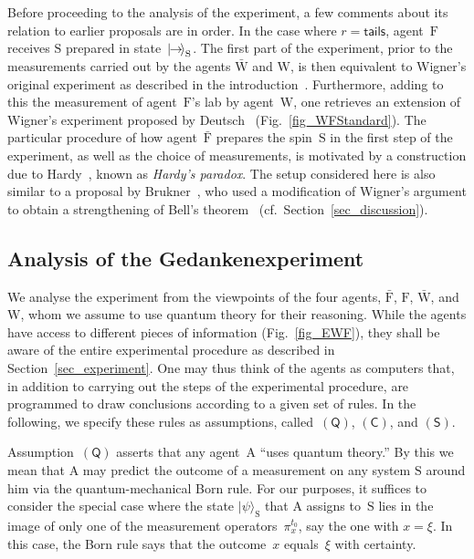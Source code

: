 \documentclass{article}
\theoremstyle{mystyle}
\theoremstyle{definition}
\newcommand*{\ket}[1]{{| #1 \rangle}}
\newcommand*{\Friendone}{\mathrm{\bar{F}}}
\newcommand*{\Friendtwo}{\mathrm{F}}
\newcommand*{\Assistant}{\mathrm{\bar{W}}}
\newcommand*{\Wigner}{\mathrm{W}}
\newcommand*{\Agent}{\mathrm{A}}
\newcommand*{\System}{\mathrm{S}}
\newcommand*{\Spin}{\mathrm{S}}
\newcommand*{\spinright}{\ket{{\hspace{-0.2ex}\rightarrow\hspace{-0.4ex}}}}
\newcommand*{\QT}{\mathsf{(Q)}}
\newcommand*{\SW}{\mathsf{(S)}}
\newcommand*{\SelfCons}{\mathsf{(C)}}
\newcommand*{\tail}{\mathsf{tails}}
\begin{document}
Before proceeding to the analysis of the experiment, a few comments about its relation to earlier proposals are in order. In the case where $r=\tail$,  agent~$\Friendtwo$ receives $\Spin$ prepared in state~$\spinright_{\Spin}$. The first part of the experiment, prior to the measurements carried out by the agents $\Assistant$ and $\Wigner$, is then equivalent to Wigner's original experiment as described in the introduction~\cite{Wigner67}. Furthermore, adding to this the measurement of agent~$\Friendtwo$'s lab by agent~$\Wigner$, one retrieves an extension of Wigner's experiment proposed by Deutsch~\cite{Deutsch85} (Fig.~\ref{fig_WFStandard}). The particular procedure of how agent~$\Friendone$ prepares the spin~$\Spin$ in the first step of the experiment, as well as the choice of measurements,  is motivated by a construction due to Hardy~\cite{Hardy92,Hardy93}, known as \emph{Hardy's paradox}.  The setup considered here is also similar to a proposal by Brukner~\cite{Brukner2017}, who used a modification of Wigner's argument  to obtain a strengthening of Bell's theorem~\cite{Bell66} (cf.\ Section~\ref{sec_discussion}). 



\subsection{Analysis of the Gedankenexperiment} \label{sec_analysis}

We analyse the experiment from the viewpoints of the four agents, $\Friendone$, $\Friendtwo$, $\Assistant$, and $\Wigner$, whom we assume to use quantum theory for their reasoning. While the agents have access to different pieces of information (Fig.~\ref{fig_EWF}), they shall be aware of the entire experimental procedure as described in Section~\ref{sec_experiment}. One may thus think of the agents as computers that, in addition to carrying out the steps of the experimental procedure,  are programmed to draw conclusions according to a given set of rules. In the following, we specify these rules as assumptions, called~$\QT$, $\SelfCons$, and $\SW$.


 Assumption~$\QT$ asserts that any agent~$\Agent$ ``uses quantum theory.'' By this we mean that  $\Agent$ may predict the outcome of a measurement on any system $\System$ around him via the quantum-mechanical Born rule. For our purposes, it suffices to consider the special case where the state $\ket{\psi}_{\System}$ that $\Agent$ assigns to~$\System$ lies  in the image of only one of the measurement operators~$\pi_{x}^{t_0}$, say the one with $x=\xi$. In this case, the Born rule says that the outcome~$x$ equals~$\xi$ with certainty.
 
\end{document}
